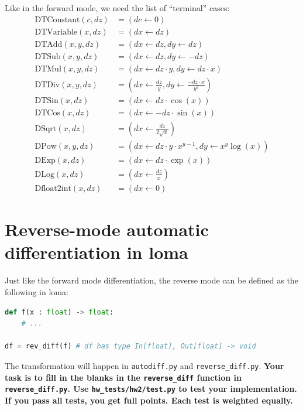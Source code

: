 Like in the forward mode, we need the list of ``terminal'' cases:
\begin{equation}
\begin{aligned}
\text{DTConstant}(c, dz) &= \left(dc \leftarrow 0\right) \\
\text{DTVariable}(x, dz) &= \left(dx \leftarrow dz\right) \\
\text{DTAdd}(x, y, dz) &= \left(dx \leftarrow dz, dy \leftarrow dz\right) \\
\text{DTSub}(x, y, dz) &= \left(dx \leftarrow dz, dy \leftarrow -dz\right) \\
\text{DTMul}(x, y, dz) &= \left(dx \leftarrow dz \cdot y, dy \leftarrow dz \cdot x\right) \\
\text{DTDiv}(x, y, dz) &= \left(dx \leftarrow \frac{dz}{y}, dy \leftarrow \frac{-dz \cdot x}{y^2}\right) \\
\text{DTSin}(x, dz) &= \left(dx \leftarrow dz \cdot \cos(x)\right) \\
\text{DTCos}(x, dz) &= \left(dx \leftarrow -dz \cdot \sin(x)\right) \\
\text{DSqrt}(x, dz) &= \left(dx \leftarrow \frac{dz}{2\sqrt{x}} \right) \\
\text{DPow}(x, y, dz) &= \left(dx \leftarrow dz \cdot y \cdot x^{y-1}, dy \leftarrow x^y \log(x) \right) \\
\text{DExp}(x, dz) &= \left(dx \leftarrow dz \cdot \exp(x) \right) \\
\text{DLog}(x, dz) &= \left(dx \leftarrow \frac{dz}{x} \right) \\
\text{Dfloat2int}(x, dz) &= \left(dx \leftarrow 0\right)
\end{aligned}
\end{equation}

\section{Reverse-mode automatic differentiation in loma}

Just like the forward mode differentiation, the reverse mode can be defined as the following in loma:
\begin{lstlisting}[language=Python]
def f(x : float) -> float:
	# ...

df = rev_diff(f) # df has type In[float], Out[float] -> void
\end{lstlisting}

The transformation will happen in \lstinline{autodiff.py} and \lstinline{reverse_diff.py}. \textbf{Your task is to fill in the blanks in the \lstinline{reverse_diff} function in \lstinline{reverse_diff.py}. Use \lstinline{hw_tests/hw2/test.py} to test your implementation. If you pass all tests, you get full points. Each test is weighted equally.}

